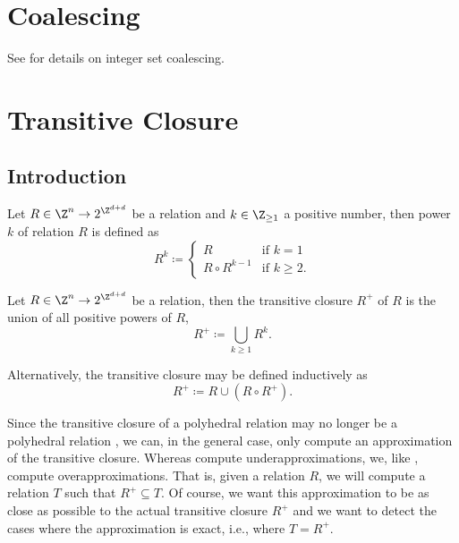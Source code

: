 \section{Coalescing}\label{s:coalescing}

See \textcite{Verdoolaege2015impact} for details on integer set coalescing.

\section{Transitive Closure}

\subsection{Introduction}

\begin{definition}
Let $R \in \Z^n \to 2^{\Z^{d+d}}$ be a relation and
$k \in \Z_{\ge 1}$
a positive number, then power $k$ of relation $R$ is defined as
\begin{equation}
\label{eq:transitive:power}
R^k \coloneqq
\begin{cases}
R & \text{if $k = 1$}
\\
R \circ R^{k-1} & \text{if $k \ge 2$}
.
\end{cases}
\end{equation}
\end{definition}

\begin{definition}
Let $R \in \Z^n \to 2^{\Z^{d+d}}$ be a relation,
then the transitive closure $R^+$ of $R$ is the union
of all positive powers of $R$,
$$
R^+ \coloneqq \bigcup_{k \ge 1} R^k
.
$$
\end{definition}
Alternatively, the transitive closure may be defined
inductively as
\begin{equation}
\label{eq:transitive:inductive}
R^+ \coloneqq R \cup \left(R \circ R^+\right)
.
\end{equation}

Since the transitive closure of a polyhedral relation
may no longer be a polyhedral relation \parencite{Kelly1996closure},
we can, in the general case, only compute an approximation
of the transitive closure.
Whereas \textcite{Kelly1996closure} compute underapproximations,
we, like \textcite{Beletska2009}, compute overapproximations.
That is, given a relation $R$, we will compute a relation $T$
such that $R^+ \subseteq T$.  Of course, we want this approximation
to be as close as possible to the actual transitive closure
$R^+$ and we want to detect the cases where the approximation is
exact, i.e., where $T = R^+$.

